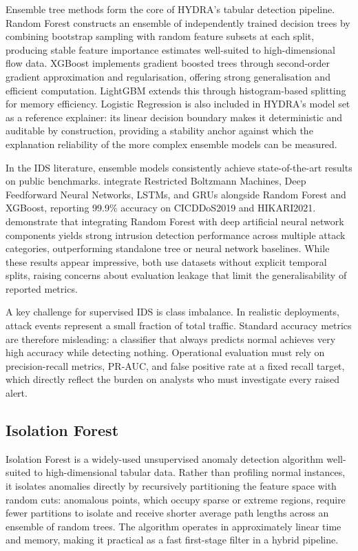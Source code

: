 \documentclass[12pt,a4paper]{report}
\begin{document}
Ensemble tree methods form the core of HYDRA's tabular detection pipeline. Random Forest \citep{breiman2001} constructs an ensemble of independently trained decision trees by combining bootstrap sampling with random feature subsets at each split, producing stable feature importance estimates well-suited to high-dimensional flow data. XGBoost \citep{chen2016} implements gradient boosted trees through second-order gradient approximation and regularisation, offering strong generalisation and efficient computation. LightGBM \citep{ke2017} extends this through histogram-based splitting for memory efficiency. Logistic Regression is also included in HYDRA's model set as a reference explainer: its linear decision boundary makes it deterministic and auditable by construction, providing a stability anchor against which the explanation reliability of the more complex ensemble models can be measured.

In the IDS literature, ensemble models consistently achieve state-of-the-art results on public benchmarks. \citet{pansare2024} integrate Restricted Boltzmann Machines, Deep Feedforward Neural Networks, LSTMs, and GRUs alongside Random Forest and XGBoost, reporting 99.9\% accuracy on CICDDoS2019 and HIKARI2021. \citet{rani2024} demonstrate that integrating Random Forest with deep artificial neural network components yields strong intrusion detection performance across multiple attack categories, outperforming standalone tree or neural network baselines. While these results appear impressive, both use datasets without explicit temporal splits, raising concerns about evaluation leakage that limit the generalisability of reported metrics.

A key challenge for supervised IDS is class imbalance. In realistic deployments, attack events represent a small fraction of total traffic. Standard accuracy metrics are therefore misleading: a classifier that always predicts normal achieves very high accuracy while detecting nothing. Operational evaluation must rely on precision-recall metrics, PR-AUC, and false positive rate at a fixed recall target, which directly reflect the burden on analysts who must investigate every raised alert.

\subsection{Isolation Forest}
\label{sec:iforest}

Isolation Forest \citep{liu2008} is a widely-used unsupervised anomaly detection algorithm well-suited to high-dimensional tabular data. Rather than profiling normal instances, it isolates anomalies directly by recursively partitioning the feature space with random cuts: anomalous points, which occupy sparse or extreme regions, require fewer partitions to isolate and receive shorter average path lengths across an ensemble of random trees. The algorithm operates in approximately linear time and memory, making it practical as a fast first-stage filter in a hybrid pipeline.
\end{document}
